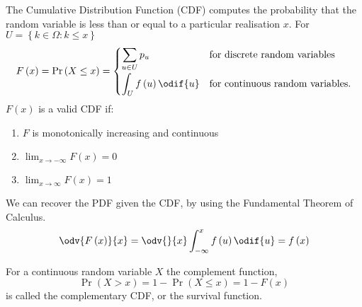 \documentclass{article}
\begin{document}
\begin{definition}
    The Cumulative Distribution Function (CDF) computes the probability that the random variable is
    less than or equal to a particular realisation \(x\). For \(U = \left\{ k \in \Omega : k \leq x \right\}\)
    \begin{equation*}
        F\left( x \right) = \Pr{\left( X \leq x \right)} = \begin{cases}
            \displaystyle \sum_{u \in U} p_u                  & \text{for discrete random variables}    \\[0.4cm]
            \displaystyle \int_{U} f\left( u \right) \odif{u} & \text{for continuous random variables}.
        \end{cases}
    \end{equation*}
    \(F\left( x \right)\) is a valid CDF if:
    \begin{enumerate}
        \item \(F\) is monotonically increasing and continuous
        \item \(\lim_{x \to -\infty} F\left( x \right) = 0\)
        \item \(\lim_{x \to \infty} F\left( x \right) = 1\)
    \end{enumerate}
    We can recover the PDF given the CDF, by using the Fundamental Theorem of Calculus.
    \begin{equation*}
        \odv{F\left( x \right)}{x} = \odv{}{x} \int_{-\infty}^x f\left( u \right) \odif{u} = f\left( x \right)
    \end{equation*}
\end{definition}
\begin{definition}
    For a continuous random variable \(X\) the complement function,
    \begin{equation*}
        \Pr{\left( X > x \right)} = 1 - \Pr{\left( X \leq x \right)} = 1 - F\left( x \right)
    \end{equation*}
    is called the complementary CDF, or the survival function.
\end{definition}
\end{document}
